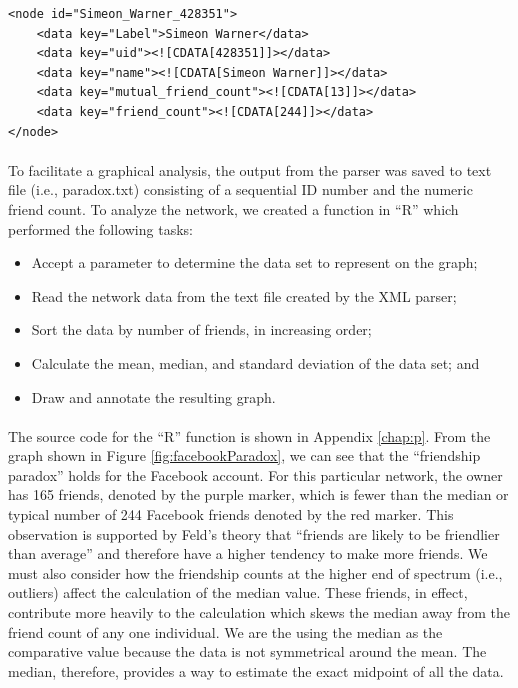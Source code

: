\documentclass[letterpaper,11pt]{report}
\begin{document}
\begin{savenotes}
\begin{verbatim}
<node id="Simeon_Warner_428351">
    <data key="Label">Simeon Warner</data>
    <data key="uid"><![CDATA[428351]]></data>
    <data key="name"><![CDATA[Simeon Warner]]></data>
    <data key="mutual_friend_count"><![CDATA[13]]></data>
    <data key="friend_count"><![CDATA[244]]></data>
</node>
\end{verbatim}

\paragraph{}To facilitate a graphical analysis, the output from the parser was saved to text file (i.e., paradox.txt) consisting of a sequential ID number and the numeric friend count. To analyze the network, we created a function in ``R'' which performed the following tasks:
\begin{itemize}
\item Accept a parameter to determine the data set to represent on the graph;
\item Read the network data from the text file created by the XML parser;
\item Sort the data by number of friends, in increasing order;
\item Calculate the mean, median, and standard deviation of the data set; and
\item Draw and annotate the resulting graph.
\end{itemize}
\paragraph{}The source code for the ``R'' function is shown in Appendix \ref{chap:p}. From the graph shown in Figure \ref{fig:facebookParadox}, we can see that the ``friendship paradox'' holds for the Facebook account. For this particular network, the owner has 165 friends, denoted by the purple marker, which is fewer than the median or typical number of 244 Facebook friends denoted by the red marker. This observation is supported by Feld's \cite{feld1991your} theory that ``friends are likely to be friendlier than average'' and therefore have a higher tendency to make more friends. We must also consider how the friendship counts at the higher end of spectrum (i.e., outliers) affect the calculation of the median value. These friends, in effect, contribute more heavily to the calculation which skews the median away from the friend count of any one individual. We are the using the median as the comparative value because the data is not symmetrical around the mean. The median, therefore, provides a way to estimate the exact midpoint of all the data.



\end{savenotes}
\end{document}
